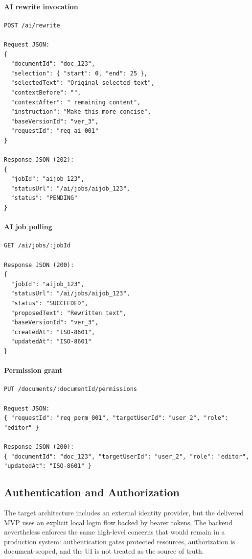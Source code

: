 \paragraph{AI rewrite invocation}
\begin{lstlisting}[language={}]
POST /ai/rewrite

Request JSON:
{
  "documentId": "doc_123",
  "selection": { "start": 0, "end": 25 },
  "selectedText": "Original selected text",
  "contextBefore": "",
  "contextAfter": " remaining content",
  "instruction": "Make this more concise",
  "baseVersionId": "ver_3",
  "requestId": "req_ai_001"
}

Response JSON (202):
{
  "jobId": "aijob_123",
  "statusUrl": "/ai/jobs/aijob_123",
  "status": "PENDING"
}
\end{lstlisting}

\paragraph{AI job polling}
\begin{lstlisting}[language={}]
GET /ai/jobs/:jobId

Response JSON (200):
{
  "jobId": "aijob_123",
  "statusUrl": "/ai/jobs/aijob_123",
  "status": "SUCCEEDED",
  "proposedText": "Rewritten text",
  "baseVersionId": "ver_3",
  "createdAt": "ISO-8601",
  "updatedAt": "ISO-8601"
}
\end{lstlisting}

\paragraph{Permission grant}
\begin{lstlisting}[language={}]
PUT /documents/:documentId/permissions

Request JSON:
{ "requestId": "req_perm_001", "targetUserId": "user_2", "role": "editor" }

Response JSON (200):
{ "documentId": "doc_123", "targetUserId": "user_2", "role": "editor", "updatedAt": "ISO-8601" }
\end{lstlisting}

\subsection{Authentication and Authorization}

The target architecture includes an external identity provider, but the delivered MVP uses an explicit
local login flow backed by bearer tokens. The backend nevertheless enforces the same high-level concerns
that would remain in a production system: authentication gates protected resources, authorization is
document-scoped, and the UI is not treated as the source of truth.

